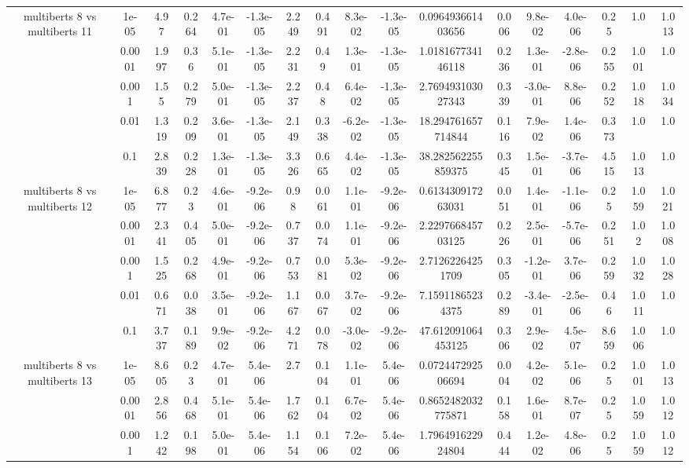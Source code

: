 \begin{tabular}{|c|c|c|c|c|c|c|c|c|c|c|c|c|c|c|c|c|}
\hline
\multirow{5}{*}{multiberts 8 vs multiberts 11} & 1e-05 & 4.97 & 0.264 & 4.7e-01 & -1.3e-05 & 2.249 & 0.491 & 8.3e-02 & -1.3e-05 & 0.096493661403656 & 0.006 & 9.8e-02 & 4.0e-06 & 0.25 & 1.0 & 1.013 \\
 & 0.0001 & 1.997 & 0.36 & 5.1e-01 & -1.3e-05 & 2.231 & 0.49 & 1.3e-01 & -1.3e-05 & 1.018167734146118 & 0.236 & 1.3e-01 & -2.8e-06 & 0.255 & 1.001 & 1.0 \\
 & 0.001 & 1.55 & 0.279 & 5.0e-01 & -1.3e-05 & 2.237 & 0.48 & 6.4e-02 & -1.3e-05 & 2.769493103027343 & 0.339 & -3.0e-01 & 8.8e-06 & 0.252 & 1.018 & 1.034 \\
 & 0.01 & 1.319 & 0.209 & 3.6e-01 & -1.3e-05 & 2.149 & 0.338 & -6.2e-02 & -1.3e-05 & 18.294761657714844 & 0.116 & 7.9e-02 & 1.4e-06 & 0.373 & 1.0 & 1.0 \\
 & 0.1 & 2.839 & 0.228 & 1.3e-01 & -1.3e-05 & 3.326 & 0.665 & 4.4e-02 & -1.3e-05 & 38.282562255859375 & 0.345 & 1.5e-01 & -3.7e-06 & 4.515 & 1.013 & 1.0 \\
\hline
\multirow{5}{*}{multiberts 8 vs multiberts 12} & 1e-05 & 6.877 & 0.23 & 4.6e-01 & -9.2e-06 & 0.98 & 0.061 & 1.1e-01 & -9.2e-06 & 0.613430917263031 & 0.051 & 1.4e-01 & -1.1e-06 & 0.25 & 1.059 & 1.021 \\
 & 0.0001 & 2.341 & 0.405 & 5.0e-01 & -9.2e-06 & 0.737 & 0.074 & 1.1e-01 & -9.2e-06 & 2.229766845703125 & 0.226 & 2.5e-01 & -5.7e-06 & 0.251 & 1.02 & 1.008 \\
 & 0.001 & 1.525 & 0.268 & 4.9e-01 & -9.2e-06 & 0.753 & 0.081 & 5.3e-02 & -9.2e-06 & 2.71262264251709 & 0.305 & -1.2e-01 & 3.7e-06 & 0.259 & 1.032 & 1.028 \\
 & 0.01 & 0.671 & 0.038 & 3.5e-01 & -9.2e-06 & 1.167 & 0.067 & 3.7e-02 & -9.2e-06 & 7.15911865234375 & 0.289 & -3.4e-01 & -2.5e-06 & 0.46 & 1.011 & 1.0 \\
 & 0.1 & 3.737 & 0.189 & 9.9e-02 & -9.2e-06 & 4.271 & 0.078 & -3.0e-02 & -9.2e-06 & 47.612091064453125 & 0.306 & 2.9e-02 & 4.5e-07 & 8.659 & 1.006 & 1.0 \\
\hline
\multirow{5}{*}{multiberts 8 vs multiberts 13} & 1e-05 & 8.605 & 0.23 & 4.7e-01 & 5.4e-06 & 2.7 & 0.104 & 1.1e-01 & 5.4e-06 & 0.072447292506694 & 0.004 & 4.2e-02 & 5.1e-06 & 0.25 & 1.001 & 1.013 \\
 & 0.0001 & 2.856 & 0.468 & 5.1e-01 & 5.4e-06 & 1.762 & 0.104 & 6.7e-02 & 5.4e-06 & 0.8652482032775871 & 0.158 & 1.6e-01 & 8.7e-07 & 0.25 & 1.059 & 1.012 \\
 & 0.001 & 1.242 & 0.198 & 5.0e-01 & 5.4e-06 & 1.154 & 0.106 & 7.2e-02 & 5.4e-06 & 1.796491622924804 & 0.444 & 1.2e-02 & 4.8e-06 & 0.25 & 1.059 & 1.012 \\

\end{tabular}
